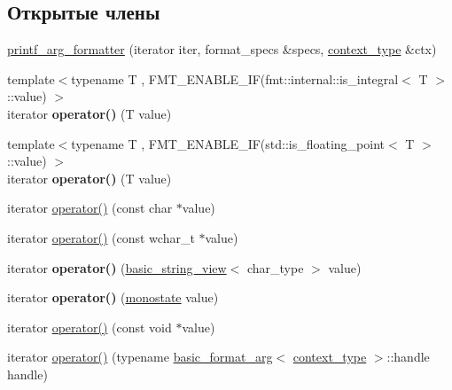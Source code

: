 \subsection*{Открытые члены}
\begin{DoxyCompactItemize}
\item 
\hyperlink{classprintf__arg__formatter_affaad59bc384a1d5c22aa5a80d3804ee}{printf\+\_\+arg\+\_\+formatter} (iterator iter, format\+\_\+specs \&specs, \hyperlink{classbasic__printf__context}{context\+\_\+type} \&ctx)
\item 
\mbox{\label{classprintf__arg__formatter_a7dcc9071753f5f7e7d630bc35e5520f5}} 
{\footnotesize template$<$typename T , F\+M\+T\+\_\+\+E\+N\+A\+B\+L\+E\+\_\+\+I\+F(fmt\+::internal\+::is\+\_\+integral$<$ T $>$\+::value) $>$ }\\iterator {\bfseries operator()} (T value)
\item 
\mbox{\label{classprintf__arg__formatter_a7dcc9071753f5f7e7d630bc35e5520f5}} 
{\footnotesize template$<$typename T , F\+M\+T\+\_\+\+E\+N\+A\+B\+L\+E\+\_\+\+I\+F(std\+::is\+\_\+floating\+\_\+point$<$ T $>$\+::value) $>$ }\\iterator {\bfseries operator()} (T value)
\item 
iterator \hyperlink{classprintf__arg__formatter_a4e462c5b70ceef75a41261472aa56313}{operator()} (const char $\ast$value)
\item 
iterator \hyperlink{classprintf__arg__formatter_a880170cd3e3ace7546cb01268586ac77}{operator()} (const wchar\+\_\+t $\ast$value)
\item 
\mbox{\label{classprintf__arg__formatter_a5207b86409ce0aab09db50ae8200097e}} 
iterator {\bfseries operator()} (\hyperlink{classbasic__string__view}{basic\+\_\+string\+\_\+view}$<$ char\+\_\+type $>$ value)
\item 
\mbox{\label{classprintf__arg__formatter_ae4e5a2115e2770ef22b98b3329a5916a}} 
iterator {\bfseries operator()} (\hyperlink{structmonostate}{monostate} value)
\item 
iterator \hyperlink{classprintf__arg__formatter_a22c7d349112400ecf9a66005b1a0229e}{operator()} (const void $\ast$value)
\item 
iterator \hyperlink{classprintf__arg__formatter_a57ded50a248eab9775966e05330dfcb5}{operator()} (typename \hyperlink{classbasic__format__arg}{basic\+\_\+format\+\_\+arg}$<$ \hyperlink{classbasic__printf__context}{context\+\_\+type} $>$\+::handle handle)
\end{DoxyCompactItemize}
